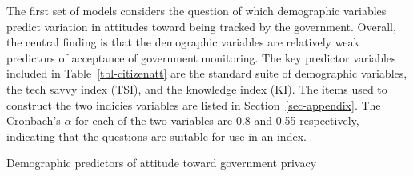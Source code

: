 \documentclass[
  letterpaper,
  DIV=11,
  numbers=noendperiod]{scrartcl}
\begin{document}
The first set of models considers the question of which demographic
variables predict variation in attitudes toward being tracked by the
government. Overall, the central finding is that the demographic
variables are relatively weak predictors of acceptance of government
monitoring. The key predictor variables included in
Table~\ref{tbl-citizenatt} are the standard suite of demographic
variables, the tech savvy index (TSI), and the knowledge index (KI). The
items used to construct the two indicies variables are listed in
Section~\ref{sec-appendix}. The Cronbach's \(\alpha\) for each of the
two variables are 0.8 and 0.55 respectively, indicating that the
questions are suitable for use in an index.

\begin{table}

\caption{\label{tbl-citizenatt}Demographic predictors of attitude toward
government privacy}

\centering{

}
\end{table}
\end{document}

